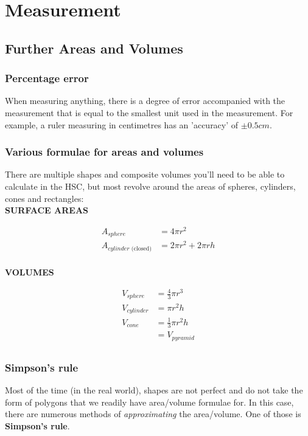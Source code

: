 \documentclass{article}
\begin{document}
\section{Measurement}

\subsection{Further Areas and Volumes}

\subsubsection{Percentage error}

When measuring anything, there is a degree of error accompanied with the measurement that is equal to the smallest unit used in the measurement. For example, a ruler measuring in centimetres has an 'accuracy' of $\pm 0.5cm$. 

\subsubsection{Various formulae for areas and volumes}

There are multiple shapes and composite volumes you'll need to be able to calculate in the HSC, but most revolve around the areas of spheres, cylinders, cones and rectangles: \\

\textbf{SURFACE AREAS}

\begin{align*}
A_{sphere} &= 4 \pi r^2 \\
A_{cylinder\text{ (closed)}} &= 2 \pi r^2 + 2 \pi rh \\
\end{align*} 

\textbf{VOLUMES}

\begin{align*}
V_{sphere} &= \frac{4}{3}\pi r^3 \\
V_{cylinder} &= \pi r^2 h \\
V_{cone} &= \frac{1}{3}\pi r^2 h \\ 
&= V_{pyramid} \\
\end{align*}

\subsubsection{Simpson's rule}

Most of the time (in the real world), shapes are not perfect and do not take the form of polygons that we readily have area/volume formulae for. In this case, there are numerous methods of \textit{approximating} the area/volume. One of those is \textbf{Simpson's rule}. \\
\end{document}
